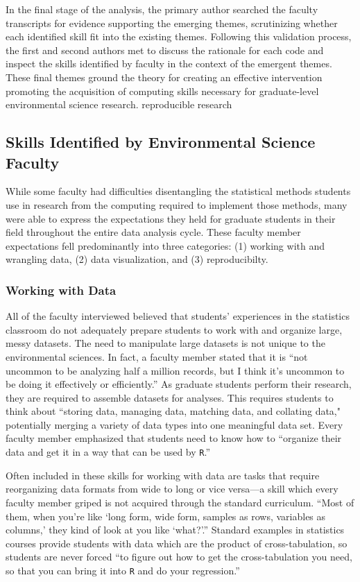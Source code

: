\documentclass[12pt]{article}
\begin{document}
\quad In the final stage of the analysis, the primary author searched the 
faculty transcripts for evidence supporting the emerging themes, scrutinizing 
whether each identified skill fit into the existing themes. Following this 
validation process, the first and second authors met to discuss the rationale
for each code and inspect the skills identified by faculty in the context of the
emergent themes. These final themes ground the theory for creating an effective
intervention promoting the acquisition of computing skills necessary for 
graduate-level environmental science research. reproducible
research

\subsection{Skills Identified by Environmental Science Faculty}

\quad While some faculty had difficulties disentangling the statistical methods
students use in research from the computing required to implement those methods,
many were able to express the expectations they held for graduate students in
their field throughout the entire data analysis cycle. These faculty member
expectations fell predominantly into three categories: (1) working with and
wrangling data, (2) data visualization, and (3) reproducibilty.

\subsubsection{Working with Data}  

\quad All of the faculty interviewed believed that students' experiences in the
statistics classroom do not adequately prepare students to work with and
organize large, messy datasets. The need to manipulate large datasets is not
unique to the environmental sciences. In fact, a faculty member stated that it
is ``not uncommon to be analyzing half a million records, but I think it's
uncommon to be doing it effectively or efficiently.'' As graduate students
perform their research, they are required to assemble datasets for analyses.
This requires students to think about ``storing data, managing data, matching
data, and collating data," potentially merging a variety of data types into one
meaningful data set. Every faculty member emphasized that students need to know
how to ``organize their data and get it in a way that can be used by 
\texttt{R}.'' 
  
\quad Often included in these skills for working with data are tasks that 
require reorganizing data formats from wide to long or vice versa---a skill 
which every faculty member griped is not acquired through the standard 
curriculum. ``Most of them, when you're like `long form, wide form, samples as 
rows, variables as columns,' they kind of look at you like `what?'.'' Standard 
examples in statistics courses provide students with data which are the product
of cross-tabulation, so students are never forced ``to figure out how to get the
cross-tabulation you need, so that you can bring it into \texttt{R} and do your
regression.''
\end{document}
